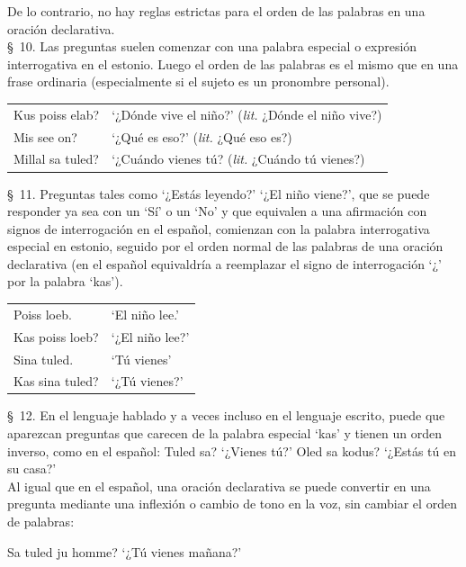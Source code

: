 De lo contrario, no hay reglas estrictas para el orden de las palabras en una oración declarativa.\\

\S\ 10. Las preguntas suelen comenzar con una palabra especial o expresión interrogativa en el estonio. Luego el orden de las palabras es el mismo que en una frase ordinaria (especialmente si el sujeto es un pronombre personal).

\begin{center}
\begin{tabular}{ l l }
	Kus poiss elab? 	& `¿Dónde vive el niño?' (\emph{lit.} ¿Dónde el niño vive?) \\
	Mis see on?			& `¿Qué es eso?' (\emph{lit.} ¿Qué eso es?) \\
	Millal sa tuled? 	& `¿Cuándo vienes tú? (\emph{lit.} ¿Cuándo tú vienes?)
\end{tabular}
\end{center}
\bigskip

\S\ 11. Preguntas tales como `¿Estás leyendo?' `¿El niño viene?', que se puede responder ya sea con un `Sí' o un `No' y que equivalen a una afirmación con signos de interrogación en el español, comienzan con la palabra interrogativa especial  en estonio, seguido por el orden normal de las palabras de una oración declarativa (en el español equivaldría a reemplazar el signo de interrogación `¿' por la palabra `kas').

\begin{center}
\begin{tabular}{ l l }
	Poiss loeb. 	& `El niño lee.' \\
	Kas poiss loeb? & `¿El niño lee?' \\
	Sina tuled.		& `Tú vienes' \\
	Kas sina tuled?	& `¿Tú vienes?' 
\end{tabular}
\end{center}
\bigskip

\S\ 12. En el lenguaje hablado y a veces incluso en el lenguaje escrito, puede que aparezcan preguntas que carecen de la palabra especial `kas' y tienen un orden inverso, como en el español: Tuled sa? `¿Vienes tú?' Oled sa kodus? `¿Estás tú en su casa?'\\

Al igual que en el español, una oración declarativa se puede convertir en una pregunta mediante una inflexión o cambio de tono en la voz, sin cambiar el orden de palabras:

\begin{center}
Sa tuled ju homme? `¿Tú vienes mañana?'\\
\end{center}

